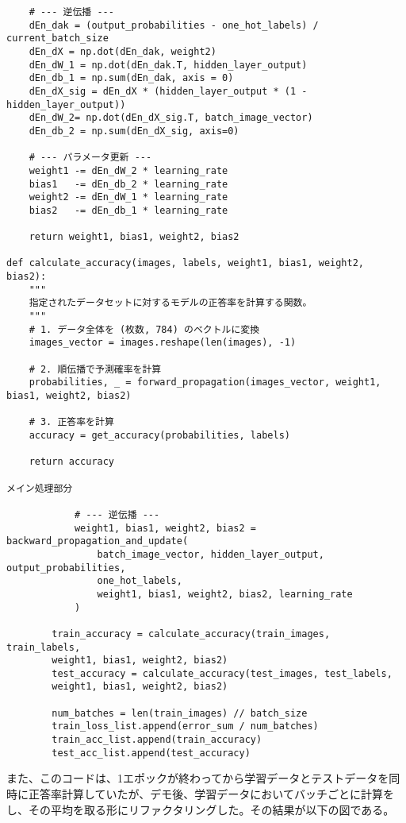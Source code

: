 \documentclass[11px,a4,dvipdfmx]{jsarticle}
\begin{document}
\begin{verbatim}
    # --- 逆伝播 ---
    dEn_dak = (output_probabilities - one_hot_labels) / current_batch_size
    dEn_dX = np.dot(dEn_dak, weight2)
    dEn_dW_1 = np.dot(dEn_dak.T, hidden_layer_output)
    dEn_db_1 = np.sum(dEn_dak, axis = 0)
    dEn_dX_sig = dEn_dX * (hidden_layer_output * (1 - hidden_layer_output))
    dEn_dW_2= np.dot(dEn_dX_sig.T, batch_image_vector)
    dEn_db_2 = np.sum(dEn_dX_sig, axis=0)

    # --- パラメータ更新 ---
    weight1 -= dEn_dW_2 * learning_rate 
    bias1   -= dEn_db_2 * learning_rate
    weight2 -= dEn_dW_1 * learning_rate 
    bias2   -= dEn_db_1 * learning_rate
    
    return weight1, bias1, weight2, bias2

def calculate_accuracy(images, labels, weight1, bias1, weight2, bias2):
    """
    指定されたデータセットに対するモデルの正答率を計算する関数。
    """
    # 1. データ全体を (枚数, 784) のベクトルに変換
    images_vector = images.reshape(len(images), -1)
    
    # 2. 順伝播で予測確率を計算
    probabilities, _ = forward_propagation(images_vector, weight1, bias1, weight2, bias2)
    
    # 3. 正答率を計算
    accuracy = get_accuracy(probabilities, labels)
    
    return accuracy

メイン処理部分
            
            # --- 逆伝播 ---
            weight1, bias1, weight2, bias2 = backward_propagation_and_update(
                batch_image_vector, hidden_layer_output, output_probabilities, 
                one_hot_labels,
                weight1, bias1, weight2, bias2, learning_rate
            )

        train_accuracy = calculate_accuracy(train_images, train_labels, 
        weight1, bias1, weight2, bias2)
        test_accuracy = calculate_accuracy(test_images, test_labels, 
        weight1, bias1, weight2, bias2)
        
        num_batches = len(train_images) // batch_size
        train_loss_list.append(error_sum / num_batches)
        train_acc_list.append(train_accuracy)
        test_acc_list.append(test_accuracy)
\end{verbatim}
また、このコードは、1エポックが終わってから学習データとテストデータを同時に正答率計算していたが、デモ後、学習データにおいてバッチごとに計算をし、その平均を取る形にリファクタリングした。その結果が以下の図である。
    
\end{document}
